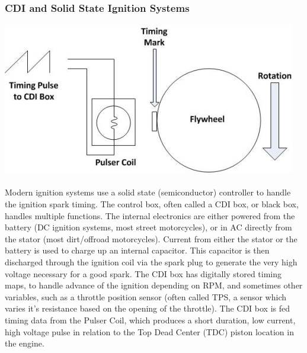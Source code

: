 \documentclass[a4paper]{article}
\begin{document}
\subsubsection{CDI and Solid State Ignition Systems}
\includegraphics[scale=0.7]{pulser-coil-and-timing} \\ \\
Modern ignition systems use a solid state (semiconductor) controller to handle the ignition spark timing. 
The control box, often called a CDI box, or black box, handles multiple functions. 
The internal electronics are either powered from the battery (DC ignition systems, most street motorcycles), or in AC directly from the stator (most dirt/offroad motorcycles). 
Current from either the stator or the battery is used to charge up an internal capacitor. 
This capacitor is then discharged through the ignition coil via the spark plug to generate the very high voltage necessary for a good spark. 
The CDI box has digitally stored timing maps, to handle advance of the ignition depending on RPM, and sometimes other variables, such as a throttle position sensor (often called TPS, a sensor which varies it's resistance based on the opening of the throttle). 
The CDI box is fed timing data from the Pulser Coil, which produces a short duration, low current, high voltage pulse in relation to the Top Dead Center (TDC) piston location in the engine. 
\end{document}
